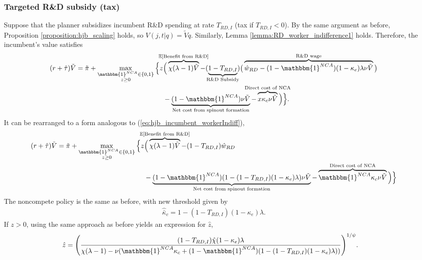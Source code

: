 \documentclass[11pt,english]{article}
\theoremstyle{definition}
\begin{document}
\subsubsection{Targeted R\&D subsidy (tax)}\label{appendix:model:efficiencyderivations:OIRDtax}

Suppose that the planner subsidizes incumbent R\&D spending at rate $T_{RD,I}$ (tax if $T_{RD,I} < 0$). By the same argument as before, Proposition \ref{proposition:hjb_scaling} holds, so $V(j,t|q) = \tilde{V}q$. Similarly, Lemma \ref{lemma:RD_worker_indifference1} holds. Therefore, the incumbent's value satisfies
\begin{align}
	(r + \hat{\tau}) \tilde{V} = \tilde{\pi} + \max_{\substack{\mathbbm{1}^{NCA} \in \{0,1\} \\ z \ge 0}} \Big\{z &\Big( \overbrace{\chi (\lambda - 1) \tilde{V}}^{\mathclap{\mathbb{E}[\textrm{Benefit from R\&D}]}}- (\underbrace{1-T_{RD,I}}_{\mathclap{\text{R\&D Subsidy}}}) \big( \overbrace{\hat{w}_{RD} - (1-\mathbbm{1}^{NCA})(1-\kappa_e)\lambda \nu \tilde{V}}^{\mathclap{\text{R\&D wage}}}\big) \label{eq:hjb_incumbent_RDsubsidyTargeted} \nonumber \\ 
	&-  \underbrace{(1-\mathbbm{1}^{NCA}) \nu \tilde{V}}_{\mathclap{\text{Net cost from spinout formation}}} - \overbrace{x \kappa_{c} \nu \tilde{V}}^{\mathclap{\text{Direct cost of NCA}}}\Big) \Big\}.
\end{align}
It can be rearranged to a form analogous to (\ref{eq:hjb_incumbent_workerIndiff}),
\begin{align}
	(r + \hat{\tau}) \tilde{V} = \tilde{\pi} + \max_{\substack{\mathbbm{1}^{NCA} \in \{0,1\} \\ z \ge 0}} \Big\{z &\Big( \overbrace{\chi (\lambda - 1) \tilde{V}}^{\mathclap{\mathbb{E}[\textrm{Benefit from R\&D}]}}- (1-T_{RD,I}) \hat{w}_{RD} \\
	&-  \underbrace{(1-\mathbbm{1}^{NCA})(1 - (1-T_{RD,I})(1-\kappa_{e})\lambda)\nu \tilde{V}}_{\mathclap{\text{Net cost from spinout formation}}} - \overbrace{\mathbbm{1}^{NCA} \kappa_{c} \nu \tilde{V}}^{\mathclap{\text{Direct cost of NCA}}}\Big) \Big\} \label{eq:hjb_incumbent_RDsubsidyTargeted_2}
\end{align}
The noncompete policy is the same as before, with new threshold given by 
\begin{align}
	\hat{\bar{\kappa}}_c = 1 - (1-T_{RD,I})(1-\kappa_e)\lambda.
\end{align} 
If $z > 0$, using the same approach as before yields an expression for $\hat{z}$, 
\begin{align}
	\hat{z} &= \Bigg( \frac{(1-T_{RD,I})\hat{\chi} (1-\kappa_{e}) \lambda}{\chi(\lambda -1) - \nu (\mathbbm{1}^{NCA} \kappa_c + (1-\mathbbm{1}^{NCA})(1 - (1-T_{RD,I})(1-\kappa_e)\lambda)) } \Bigg)^{1/\psi}. \label{eq:effort_entrant_RDsubsidyTargeted}
\end{align}
\end{document}
